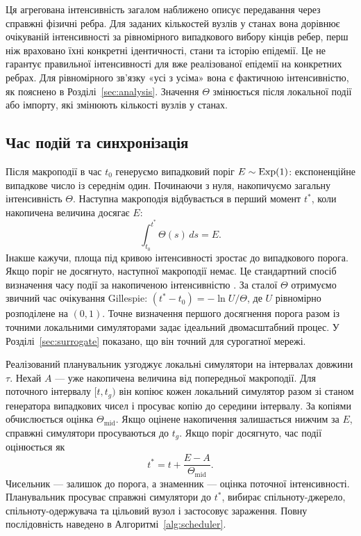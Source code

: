 Ця агрегована інтенсивність загалом наближено описує передавання через справжні фізичні ребра. Для заданих кількостей вузлів у станах вона дорівнює очікуваній інтенсивності за рівномірного випадкового вибору кінців ребер, перш ніж враховано їхні конкретні ідентичності, стани та історію епідемії. Це не гарантує правильної інтенсивності для вже реалізованої епідемії на конкретних ребрах. Для рівномірного зв'язку «усі з усіма» вона є фактичною інтенсивністю, як пояснено в Розділі~\ref{sec:analysis}. Значення $\Theta$ змінюється після локальної події або імпорту, які змінюють кількості вузлів у станах.

\subsection{Час подій та синхронізація}
\label{sec:timing}

Після макроподії в час $t_0$ генеруємо випадковий поріг $E\sim\mathrm{Exp}(1)$: експоненційне випадкове число із середнім один. Починаючи з нуля, накопичуємо загальну інтенсивність $\Theta$. Наступна макроподія відбувається в перший момент $t^\ast$, коли накопичена величина досягає $E$:
\begin{equation}
\label{eq:hazard_integral}
\int_{t_0}^{t^\ast}\Theta(s)\,ds=E.
\end{equation}
Інакше кажучи, площа під кривою інтенсивності зростає до випадкового порога. Якщо поріг не досягнуто, наступної макроподії немає. Це стандартний спосіб визначення часу події за накопиченою інтенсивністю \citep{ethier1986,anderson2007}. За сталої $\Theta$ отримуємо звичний час очікування Gillespie: $(t^\ast-t_0)=-\ln U/\Theta$, де $U$ рівномірно розподілене на $(0,1)$. Точне визначення першого досягнення порога разом із точними локальними симуляторами задає ідеальний двомасштабний процес. У Розділі~\ref{sec:surrogate} показано, що він точний для сурогатної мережі.

Реалізований планувальник узгоджує локальні симулятори на інтервалах довжини $\tau$. Нехай $A$ --- уже накопичена величина від попередньої макроподії. Для поточного інтервалу $[t,t_g)$ він копіює кожен локальний симулятор разом зі станом генератора випадкових чисел і просуває копію до середини інтервалу. За копіями обчислюється оцінка $\Theta_{\mathrm{mid}}$. Якщо оцінене накопичення залишається нижчим за $E$, справжні симулятори просуваються до $t_g$. Якщо поріг досягнуто, час події оцінюється як
\begin{equation}
\label{eq:interpolation}
t^\ast=t+\frac{E-A}{\Theta_{\mathrm{mid}}}.
\end{equation}
Чисельник --- залишок до порога, а знаменник --- оцінка поточної інтенсивності. Планувальник просуває справжні симулятори до $t^\ast$, вибирає спільноту-джерело, спільноту-одержувача та цільовий вузол і застосовує зараження. Повну послідовність наведено в Алгоритмі~\ref{alg:scheduler}.

